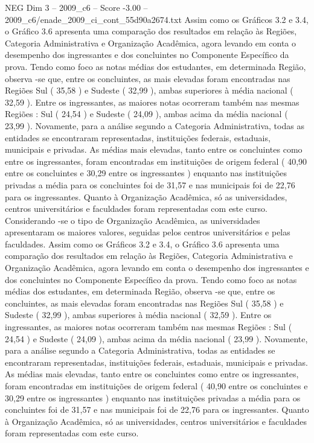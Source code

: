 \begin{textsample}{NEG Dim 3 – 2009\_c6 – Score -3.00 – 2009\_c6/enade\_2009\_ci\_cont\_55d90a2674.txt}
Assim como os Gráficos 3.2 e 3.4, o Gráfico 3.6 apresenta uma comparação dos resultados em relação às Regiões, Categoria Administrativa e Organização Acadêmica, agora levando em conta o desempenho dos ingressantes e dos concluintes no Componente Específico da prova.
Tendo como foco as notas médias dos estudantes, em determinada Região, observa -se que, entre os concluintes, as mais elevadas foram encontradas nas Regiões Sul ( 35,58 ) e Sudeste ( 32,99 ), ambas superiores à média nacional ( 32,59 ).
Entre os ingressantes, as maiores notas ocorreram também nas mesmas Regiões : Sul ( 24,54 ) e Sudeste ( 24,09 ), ambas acima da média nacional ( 23,99 ).
Novamente, para a análise segundo a Categoria Administrativa, todas as entidades se encontraram representadas, instituições federais, estaduais, municipais e privadas.
As médias mais elevadas, tanto entre os concluintes como entre os ingressantes, foram encontradas em instituições de origem federal ( 40,90 entre os concluintes e 30,29 entre os ingressantes ) enquanto nas instituições privadas a média para os concluintes foi de 31,57 e nas municipais foi de 22,76 para os ingressantes.
Quanto à Organização Acadêmica, só as universidades, centros universitários e faculdades foram representadas com este curso.
Considerando -se o tipo de Organização Acadêmica, as universidades apresentaram os maiores valores, seguidas pelos centros universitários e pelas faculdades.
Assim como os Gráficos 3.2 e 3.4, o Gráfico 3.6 apresenta uma comparação dos resultados em relação às Regiões, Categoria Administrativa e Organização Acadêmica, agora levando em conta o desempenho dos ingressantes e dos concluintes no Componente Específico da prova.
Tendo como foco as notas médias dos estudantes, em determinada Região, observa -se que, entre os concluintes, as mais elevadas foram encontradas nas Regiões Sul ( 35,58 ) e Sudeste ( 32,99 ), ambas superiores à média nacional ( 32,59 ).
Entre os ingressantes, as maiores notas ocorreram também nas mesmas Regiões : Sul ( 24,54 ) e Sudeste ( 24,09 ), ambas acima da média nacional ( 23,99 ).
Novamente, para a análise segundo a Categoria Administrativa, todas as entidades se encontraram representadas, instituições federais, estaduais, municipais e privadas.
As médias mais elevadas, tanto entre os concluintes como entre os ingressantes, foram encontradas em instituições de origem federal ( 40,90 entre os concluintes e 30,29 entre os ingressantes ) enquanto nas instituições privadas a média para os concluintes foi de 31,57 e nas municipais foi de 22,76 para os ingressantes.
Quanto à Organização Acadêmica, só as universidades, centros universitários e faculdades foram representadas com este curso.

\end{textsample}
